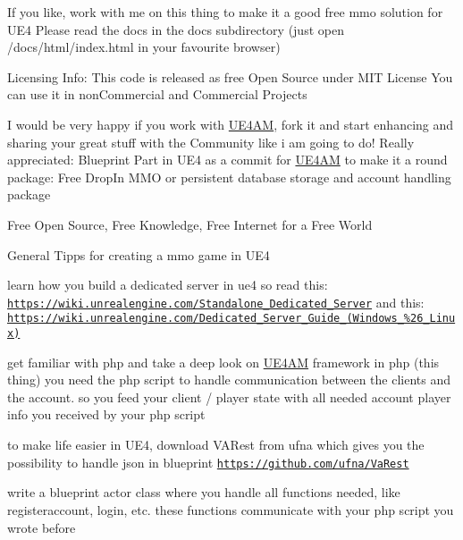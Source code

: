 If you like, work with me on this thing to make it a good free mmo solution for U\-E4 Please read the docs in the docs subdirectory (just open /docs/html/index.html in your favourite browser)

Licensing Info\-: This code is released as free Open Source under M\-I\-T License You can use it in non\-Commercial and Commercial Projects

I would be very happy if you work with \hyperlink{class_u_e4_a_m}{U\-E4\-A\-M}, fork it and start enhancing and sharing your great stuff with the Community like i am going to do! Really appreciated\-: Blueprint Part in U\-E4 as a commit for \hyperlink{class_u_e4_a_m}{U\-E4\-A\-M} to make it a round package\-: Free Drop\-In M\-M\-O or persistent database storage and account handling package

Free Open Source, Free Knowledge, Free Internet for a Free World

General Tipps for creating a mmo game in U\-E4
\begin{DoxyItemize}
\item learn how you build a dedicated server in ue4 so read this\-: \href{https://wiki.unrealengine.com/Standalone_Dedicated_Server}{\tt https\-://wiki.\-unrealengine.\-com/\-Standalone\-\_\-\-Dedicated\-\_\-\-Server} and this\-: \href{https://wiki.unrealengine.com/Dedicated_Server_Guide_(Windows_%26_Linux)}{\tt https\-://wiki.\-unrealengine.\-com/\-Dedicated\-\_\-\-Server\-\_\-\-Guide\-\_\-(\-Windows\-\_\-\%26\-\_\-\-Linux)}
\item get familiar with php and take a deep look on \hyperlink{class_u_e4_a_m}{U\-E4\-A\-M} framework in php (this thing) you need the php script to handle communication between the clients and the account. so you feed your client / player state with all needed account player info you received by your php script
\item to make life easier in U\-E4, download V\-A\-Rest from ufna which gives you the possibility to handle json in blueprint \href{https://github.com/ufna/VaRest}{\tt https\-://github.\-com/ufna/\-Va\-Rest}
\item write a blueprint actor class where you handle all functions needed, like registeraccount, login, etc. these functions communicate with your php script you wrote before 
\end{DoxyItemize}
